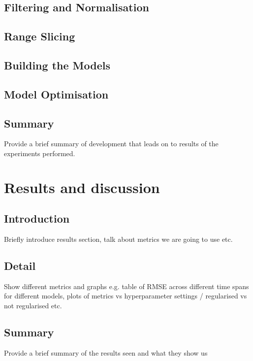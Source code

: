       \subsection{Filtering and Normalisation}

      \subsection{Range Slicing}

      \subsection{Building the Models}

      \subsection{Model Optimisation}
	
	\subsection{Summary}
        Provide a brief summary of development that leads on to results of the experiments performed.


\section{Results and discussion} %
    \subsection{Introduction}
        Briefly introduce results section, talk about metrics we are going to use etc.
	
	\subsection{Detail}
        Show different metrics and graphs e.g. table of RMSE across different time spans for different models, plots of metrics vs hyperparameter settings / regularised vs not regularised etc.
	
	\subsection{Summary}
        Provide a brief summary of the results seen and what they show us



